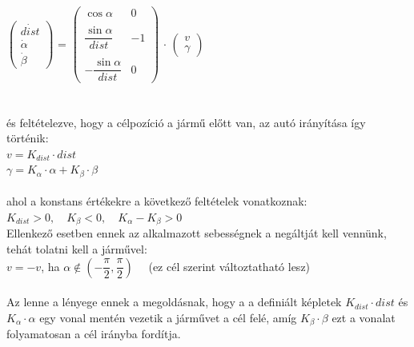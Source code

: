 \( \begin{pmatrix}
	\dot{dist}\\
	\dot{\alpha}\\
	\dot{\beta}
\end{pmatrix} \)
=
\( \begin{pmatrix}
	\cos\alpha & 0\\\\
	\dfrac{\sin\alpha}{dist} & -1\\\\
	-\dfrac{\sin\alpha}{dist} & 0
\end{pmatrix} \)
$ \cdot $ 
\( \begin{pmatrix}
	v\\
	\gamma
\end{pmatrix} \)
\\\\\\
és feltételezve, hogy a célpozíció a jármű előtt van, az autó irányítása így történik:\\

$ v = K_{dist} \cdot dist $\\

$ \gamma = K_\alpha \cdot \alpha + K_\beta \cdot \beta $\\\\
ahol a konstans értékekre a következő feltételek vonatkoznak: $ K_{dist} > 0, \quad K_\beta < 0, \quad K_\alpha - K_\beta > 0  $\\
Ellenkező esetben ennek az alkalmazott sebességnek a negáltját kell vennünk, tehát tolatni kell a járművel:\\

$ v = -v $, \qquad ha $\alpha \not\in \left(-\dfrac{\pi}{2}, \dfrac{\pi}{2} \right) \quad $ (ez cél szerint változtatható lesz)\\\\
Az lenne a lényege ennek a megoldásnak, hogy a a definiált képletek $ K_{dist} \cdot dist $ és $ K_\alpha \cdot \alpha $ egy vonal mentén vezetik a járművet a cél felé, amíg $ K_\beta \cdot \beta $ ezt a vonalat folyamatosan a cél irányba fordítja.

